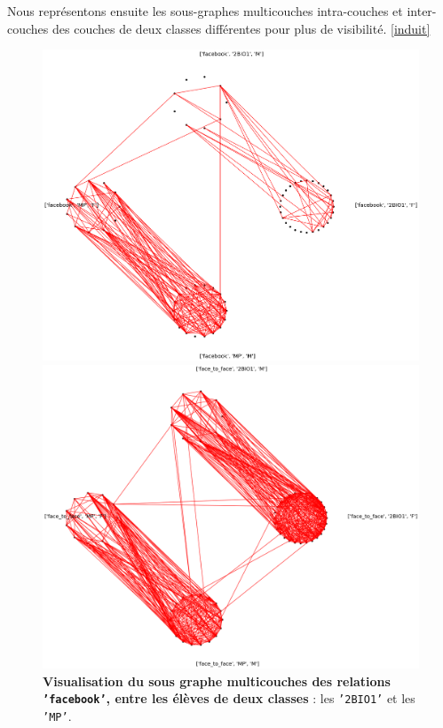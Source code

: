 \documentclass[11pt,a4paper]{article}
\theoremstyle{definition}
\theoremstyle{remark}
\theoremstyle{remark}
\begin{document}
	Nous représentons ensuite les sous-graphes multicouches intra-couches et inter-couches des couches de deux classes différentes pour plus de visibilité. \cref{induit}

\begin{figure}[H]
	\begin{minipage}[t]{0.48\textwidth}
		\captionsetup{margin=10pt}
		\includegraphics[width=\textwidth]{sousmulticlasse.png}
	\caption{\textbf{Visualisation du sous graphe multicouches des relations \texttt{'facebook'}, entre les élèves de deux classes} : les \texttt{'2BIO1'} et les \texttt{'MP'}.}
	\end{minipage}
	\begin{minipage}[t]{0.48\textwidth}
		\centering
		\includegraphics[width=\textwidth]{sousmulticlasseftf.png}

\end{minipage}
\end{figure}
\end{document}
